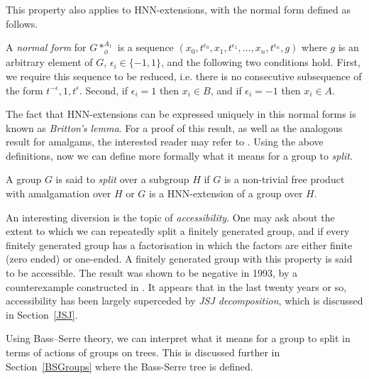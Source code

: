 This property also applies to HNN-extensions, with the normal form defined as follows.

\begin{definition}
\label{normalformhnn}
    A \emph{normal form} for \(G \ast_\phi^{A_1}\) is a sequence \((x_0, t^{\epsilon_0}, x_1, t^{\epsilon_1}, \dots, x_n, t^{\epsilon_n}, g)\) where \(g\) is an arbitrary element of \(G\), \(\epsilon_i \in \{-1, 1\}\), and the following two conditions hold. First, we require this sequence to be reduced, i.e. there is no consecutive subsequence of the form \(t^{-\epsilon}, 1, t^{\epsilon}\). Second, if \(\epsilon_i =1\) then \(x_i \in B\), and if \(\epsilon_i = -1\) then \(x_i \in A\).
\end{definition}

The fact that HNN-extensions can be expressed uniquely in this normal forms is known as \emph{Britton's lemma}. For a proof of this result, as well as the analogous result for amalgams, the interested reader may refer to \cite[p.7--8]{K10}. Using the above definitions, now we can define more formally what it means for a group to \emph{split}.

\begin{definition}[Splitting]
    A group \(G\) is said to \emph{split} over a subgroup \(H\) if \(G\) is a non-trivial free product with amalgamation over \(H\) or \(G\) is a HNN-extension of a group over \(H\). 
\end{definition}

\begin{aside}
    An interesting diversion is the topic of \emph{accessibility}. One may ask about the extent to which we can repeatedly split a finitely generated group, and if every finitely generated group has a factorisation in which the factors are either finite (zero ended) or one-ended. A finitely generated group with this property is said to be accessible. The result was shown to be negative in 1993, by a counterexample constructed in \cite{D93}. It appears that in the last twenty years or so, accessibility has been largely superceded by \emph{JSJ decomposition}, which is discussed in Section~\ref{JSJ}. 
\end{aside}

Using Bass--Serre theory, we can interpret what it means for a group to split in terms of actions of groups on trees. This is discussed further in Section~\ref{BSGroups} where the Bass-Serre tree is defined.

